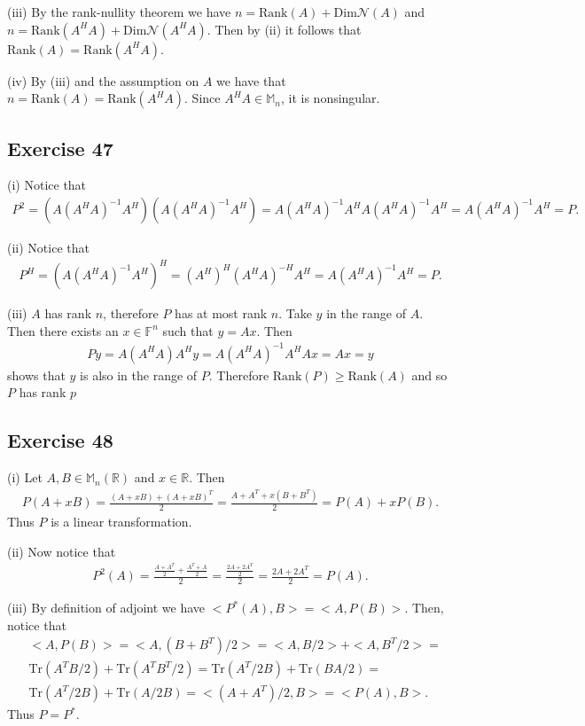 \documentclass[11.5pt, letterpaper, bibtotoc,
    tablecaptionabove, figurecaptionabove]{article}
\begin{document}
(iii)
By the rank-nullity theorem we have $n=\text{Rank}(A)+\text{Dim}\mathcal N(A)$
and $n=\text{Rank}(A^HA)+\text{Dim}\mathcal N(A^HA)$.
Then by (ii) it follows that $\text{Rank}(A)=\text{Rank}(A^HA)$.

(iv)
By (iii) and the assumption on $A$ we have that $n=\text{Rank}(A)=\text{Rank}(A^HA)$.
Since $A^HA\in\mathbb M_n$, it is nonsingular.

\subsection*{Exercise 47}
(i)
Notice that
\begin{align*}
    P^2=(A(A^HA)^{-1}A^H)(A(A^HA)^{-1}A^H)=
    A(A^HA)^{-1}A^HA(A^HA)^{-1}A^H=
    A(A^HA)^{-1}A^H=P.
\end{align*}

(ii)
Notice that
\begin{align*}
    P^H=(A(A^HA)^{-1}A^H)^H=
    (A^H)^H(A^HA)^{-H}A^H=A(A^HA)^{-1}A^H=P.
\end{align*}

(iii)
$A$ has rank $n$, therefore $P$ has at most rank $n$.
Take $y$ in the range of $A$.
Then there exists an $x\in\mathbb F^n$ such that $y=Ax$.
Then
\begin{align*}
    Py=A(A^HA)A^Hy=A(A^HA)^{-1}A^HAx=Ax=y
\end{align*}
shows that $y$ is also in the range of $P$.
Therefore $\text{Rank}(P)\geq\text{Rank}(A)$ and so $P$ has rank $p$

\subsection*{Exercise 48}
(i)
Let $A,B\in\mathbb M_n(\mathbb R)$ and $x\in\mathbb R$.
Then
\begin{align*}
    P(A+xB)=\frac{(A+xB)+(A+xB)^T}{2}=
    \frac{A+A^T+x(B+B^T)}{2}=P(A)+xP(B).
\end{align*}
Thus $P$ is a linear transformation.

(ii)
Now notice that
\begin{align*}
    P^2(A)=\frac{\frac{A+A^T}{2}+\frac{A^T+A}{2}}{2}=
    \frac{\frac{2A+2A^T}{2}}{2}=\frac{2A+2A^T}{2}=P(A).
\end{align*}

(iii)
By definition of adjoint we have $<P^*(A),B>=<A,P(B)>$.
Then, notice that
\begin{align*}
    &<A,P(B)>=<A,(B+B^T)/2>=
    <A,B/2>+<A,B^T/2>=\\
    &\text{Tr}(A^TB/2)+\text{Tr}(A^TB^T/2)=
    \text{Tr}(A^T/2B)+\text{Tr}(BA/2)=\\
    &\text{Tr}(A^T/2B)+\text{Tr}(A/2B)=
    <(A+A^T)/2,B>=<P(A),B>.
\end{align*}
Thus $P=P^*$.
\end{document}
